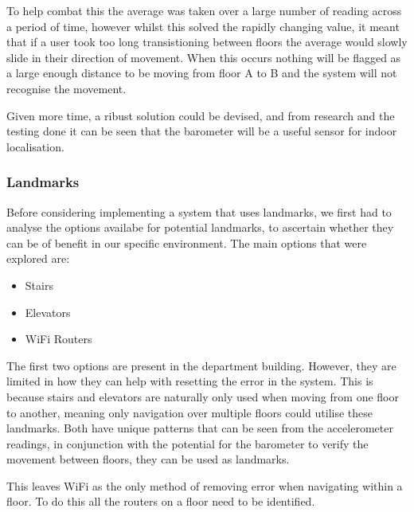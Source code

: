 \documentclass[12pt,a4paper]{report}
\begin{document}
To help combat this the average was taken over a large number of reading across a period of time, however whilst this solved the rapidly changing value, it meant that if a user took too long transistioning between floors the average would slowly slide in their direction of movement. When this occurs nothing will be flagged as a large enough distance to be moving from floor A to B and the system will not recognise the movement. 

Given more time, a ribust solution could be devised, and from research and the testing done it can be seen that the barometer will be a useful sensor for indoor localisation.

\subsubsection{Landmarks}

Before considering implementing a system that uses landmarks, we first had to analyse the options availabe for potential landmarks, to ascertain whether they can be of benefit in our specific environment. The main options that were explored are:

\begin{itemize}
	\item Stairs
	\item Elevators
	\item WiFi Routers
\end{itemize}

The first two options are present in the department building. However, they are limited in how they can help with resetting the error in the system. This is because stairs and elevators are naturally only used when moving from one floor to another, meaning only navigation over multiple floors could utilise these landmarks. Both have unique patterns that can be seen from the accelerometer readings, in conjunction with the potential for the barometer to verify the movement between floors, they can be used as landmarks.

This leaves WiFi as the only method of removing error when navigating within a floor. To do this all the routers on a floor need to be identified.
\end{document}
